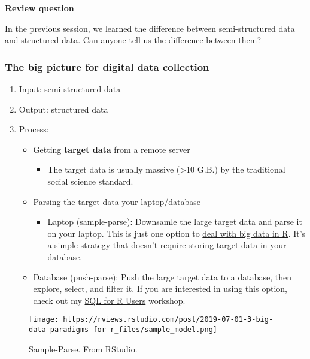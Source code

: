 \documentclass[
]{book}
\providecommand{\tightlist}{%
  \setlength{\itemsep}{0pt}\setlength{\parskip}{0pt}}
\begin{document}
\textbf{Review question}

In the previous session, we learned the difference between semi-structured data and structured data. Can anyone tell us the difference between them?

\hypertarget{the-big-picture-for-digital-data-collection}{%
\subsubsection{The big picture for digital data collection}\label{the-big-picture-for-digital-data-collection}}

\begin{enumerate}
\def\labelenumi{\arabic{enumi}.}
\item
  Input: semi-structured data
\item
  Output: structured data
\item
  Process:

  \begin{itemize}
  \item
    Getting \textbf{target data} from a remote server

    \begin{itemize}
    \tightlist
    \item
      The target data is usually massive (\textgreater10 G.B.) by the traditional social science standard.
    \end{itemize}
  \item
    Parsing the target data your laptop/database

    \begin{itemize}
    \tightlist
    \item
      Laptop (sample-parse): Downsamle the large target data and parse it on your laptop. This is just one option to \href{https://rviews.rstudio.com/2019/07/17/3-big-data-strategies-for-r/}{deal with big data in R}. It's a simple strategy that doesn't require storing target data in your database.
    \end{itemize}
  \item
    Database (push-parse): Push the large target data to a database, then explore, select, and filter it. If you are interested in using this option, check out my \href{https://github.com/dlab-berkeley/sql-for-r-users}{SQL for R Users} workshop.
  \end{itemize}
\end{enumerate}

\begin{figure}
\centering
\texttt{[image: https://rviews.rstudio.com/post/2019-07-01-3-big-data-paradigms-for-r\_files/sample\_model.png]}
\caption{Sample-Parse. From RStudio.}
\end{figure}
\end{document}
